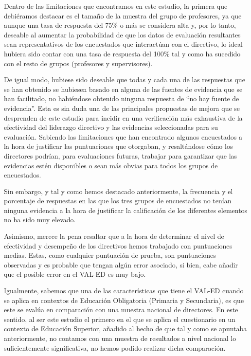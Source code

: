 \documentclass[spanish]{textolivre}
\begin{document}
Dentro de las limitaciones que encontramos en este estudio, la primera que debiéramos destacar es el tamaño de la muestra del grupo de profesores, ya que aunque una tasa de respuesta del 75\% o más se considera alta y, por lo tanto, deseable al aumentar la probabilidad de que los datos de evaluación resultantes sean representativos de los encuestados que interactúan con el directivo, lo ideal hubiera sido contar con una tasa de respuesta del 100\% tal y como ha sucedido con el resto de grupos (profesores y supervisores).

De igual modo, hubiese sido deseable que todas y cada una de las respuestas que se han obtenido se hubiesen basado en alguna de las fuentes de evidencia que se han facilitado, no habiéndose obtenido ninguna respuesta de “no hay fuente de evidencia”. Esta es sin duda una de las principales propuestas de mejora que se desprenden de este estudio para incidir en una verificación más exhaustiva de la efectividad del liderazgo directivo y las evidencias seleccionadas para su evaluación. Sabiendo las limitaciones que han encontrado algunos encuestados a la hora de justificar las puntuaciones que otorgaban, y resaltándose cómo los directores podrían, para evaluaciones futuras, trabajar para garantizar que las evidencias estén disponibles o sean más obvias para todos los grupos de encuestados.

Sin embargo, y tal y como hemos destacado anteriormente, la frecuencia y el porcentaje de respuestas en las que los tres grupos de encuestados no tenían ninguna evidencia a la hora de justificar la calificación de los diferentes elementos no ha sido muy elevado.

Asimismo, merece la pena resaltar que a la hora de determinar el nivel de efectividad y desempeño de los directivos hemos trabajado con puntuaciones medias. Estas, como cualquier puntuación de prueba, son puntuaciones observadas y es probable que tengan algún error asociado, si bien, cabe añadir que el posible error en el VAL-ED es muy bajo.

Igualmente, sabemos que una de las características que tiene el VAL-ED cuando se aplica en contextos de Educación Obligatoria (Primaria y Secundaria), es que este se evalúa en comparación con una muestra nacional de directores. En este sentido, al ser este estudio el primero en el que se aplica el cuestionario en un contexto de Educación Superior, añadido al hecho de que tal y como se apuntaba anteriormente, no contamos con una muestra de resultados a nivel nacional lo suficientemente significativa, no hemos podido realizar dicha comparación. 
\end{document}
